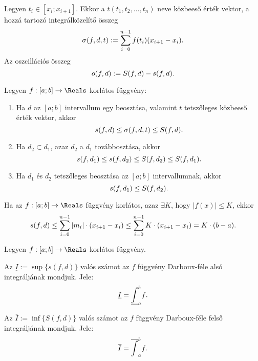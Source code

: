 \begin{definition}
  Legyen $t_i \in [x_i; x_{i +1}]$. Ekkor a $t(t_1, t_2, \dots, t_n)$ neve
  közbeeső érték vektor, a hozzá tartozó integrálközelítő összeg
  \[
    \sigma(f,d,t) := \sum_{i=0}^{n-1} f(t_i) (x_{i + 1} - x_i)
    \text.
  \]
  Az oszcillációs összeg
  \[
    o(f,d) := S(f,d) - s(f,d)
    \text.
  \]
\end{definition}

\begin{blueBox}
  Legyen $f: [a;b] \rightarrow \Reals$ korlátos függvény:

  \begin{enumerate}
    \item Ha $d$ az $[a;b]$ intervallum egy beosztása, valamint $t$ tetszőleges
          közbeeső érték vektor, akkor
          \[
            s(f,d) \leq \sigma(f,d,t) \leq S(f,d)
            \text.
          \]

    \item Ha $d_2 \subset d_1$, azaz $d_2$ a $d_1$ továbbosztása, akkor
          \[
            s(f,d_1) \leq s(f,d_2) \leq S(f,d_2) \leq S(f,d_1)
            \text.
          \]

    \item Ha $d_1$ és $d_2$ tetszőleges beosztása az $[a;b]$ intervallumnak,
          akkor
          \[
            s(f,d_1) \leq S(f,d_2)
            \text.
          \]
  \end{enumerate}
\end{blueBox}

\begin{note}
  Ha az $f: [a;b] \rightarrow \Reals$ függvény korlátos, azaz $\exists K$, hogy
  $|f(x)| \leq K$, ekkor
  \[
    s(f, d)
    \leq \sum_{i=0}^{n-1} |m_i| \cdot (x_{i+1} - x_i)
    \leq \sum_{i=0}^{n-1} K \cdot (x_{i+1} - x_i)
    = K \cdot (b - a)
    \text.
  \]
\end{note}

\begin{definition}
  Legyen $f: [a;b] \rightarrow \Reals$ korlátos függvény.

  Az $\underline{I} := \sup \{ s(f, d) \}$ valós számot az $f$ függvény
  Darboux-féle alsó integráljának mondjuk. Jele:
  \[
    \underline I =
    \underline{\int}_{a}^{b} f
    \text.
  \]

  Az $\overline{I} := \inf \{ S(f, d) \}$ valós számot az $f$ függvény
  Darboux-féle felső integráljának mondjuk. Jele:
  \[
    \overline I =
    \overline{\int}_{a}^{b} f
    \text.
  \]
\end{definition}

